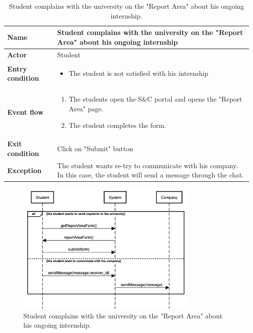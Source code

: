     \begin{table}[H]
        \centering
        \begin{tabular}{|l|p{11.9cm}|}
        \hline
        \textbf{Name}            & Student complains with the university on the "Report Area" about his ongoing internship \\\hline
        \textbf{Actor}           & Student    \\\hline
        \textbf{Entry condition} &
        \begin{itemize}
              \item The student is not satisfied with his internship
        \end{itemize}                                        \\\hline
        \textbf{Event flow}      &
        \begin{enumerate}[label=\arabic*.]
              \item The students open the S\&C portal and opens the "Report Area" page.
              \item The student completes the form.
        \end{enumerate}            \\\hline
        \textbf{Exit condition}  & Click on "Submit" button  \\\hline
        \textbf{Exception}       &  The student wants re-try to communicate with his company. In this case, the student will send a message through the chat.   \\\hline
        \end{tabular}
        \caption{Student complains with the university on the "Report Area" about his ongoing internship.}
        \label{table:Student complains with the university on the "Report Area" about his ongoing internship}
    \end{table}

    \begin{figure}[H]
        \centering
        \includegraphics[width=0.8\textwidth]{RASD/Assets/SequenceDiagrams/9-student-sends-a-complaint.png}
        \caption{Student complains with the university on the "Report Area" about his ongoing internship.}
        \label{fig:Student complains with the university on the "Report Area" about his ongoing internship}
    \end{figure}

